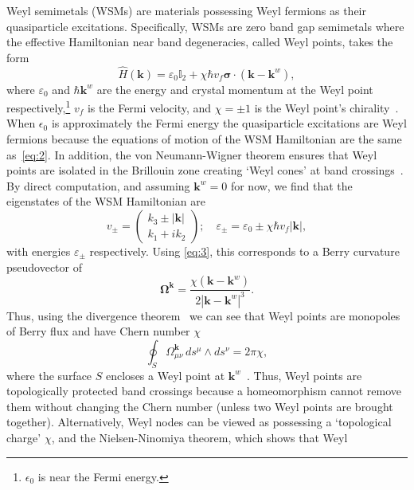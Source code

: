 \documentclass[11pt, a4paper]{article}
\begin{document}
Weyl semimetals (WSMs) are materials possessing Weyl fermions as their quasiparticle
excitations. Specifically, WSMs are zero band gap semimetals where the effective Hamiltonian
near band degeneracies, called Weyl points, takes the form
\begin{equation}\label{eq:4}
  \widehat{H}(\bm{k}) = \varepsilon_0 \mathbb{I}_2
  + \chi \hbar v_{\! f} \bm{\sigma \cdot} (\bm{k} - \bm{k}^w),
\end{equation}
where $\varepsilon_0$ and $\hbar\bm{k}^w$ are the energy and crystal momentum at the 
Weyl point respectively,\footnote{$\epsilon_0$ is near the Fermi energy.}
$v_{\! f}$ is the Fermi velocity, and $\chi= \pm 1$ is the Weyl point's chirality~\cite{WSMreview}. 
When $\epsilon_0$ is approximately the Fermi energy the quasiparticle excitations
are Weyl fermions because the equations of motion of the WSM Hamiltonian
are the same as~\eqref{eq:2}.
In addition, the von Neumann-Wigner theorem
ensures that Weyl points are isolated in 
the Brillouin zone creating `Weyl cones' at band crossings~\cite{AvoidedCrossing}.
By direct computation, and assuming $\bm{k}^w = 0$ for now,
we find that the eigenstates of the WSM Hamiltonian are 
\begin{equation}
  v_{\pm} = \begin{pmatrix} k_3 \pm |\bm{k}| \\ k_1 +ik_2 \end{pmatrix}; 
  \quad \varepsilon_\pm = \varepsilon_0 \pm \chi \hbar v_{\!f} |\bm{k}|,
\end{equation}
with energies $\varepsilon_\pm$ respectively. Using \eqref{eq:3},
this corresponds to a Berry curvature pseudovector of
\begin{equation}
\boldsymbol{\Omega}^{\bm{k}} = \frac{\chi (\bm{k}-\bm{k}^w)}{2{|\bm{k}-\bm{k}^w|}^3}.
\end{equation}
Thus, using the divergence theorem~\cite{Divthrm} we can see that
Weyl points are monopoles of Berry flux and have Chern number $\chi$
\begin{equation}
  \oint_S{\Omega^{\bm{k}}_{\mu\nu}\,ds^\mu\wedge ds^\nu} = 2\pi\chi,
\end{equation}
where the surface $S$ encloses a Weyl point at $\bm{k}^w$~\cite{SonSpivak}.
Thus, Weyl points are topologically protected band crossings because a homeomorphism
cannot remove them without changing the Chern number (unless two Weyl points are
brought together).
Alternatively, Weyl nodes can be viewed as possessing a `topological charge' $\chi$,
and the Nielsen-Ninomiya theorem, which shows that Weyl
\end{document}
